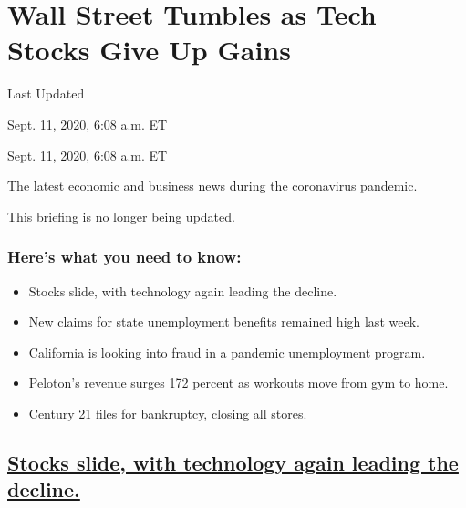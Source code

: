\hypertarget{wall-street-tumbles-as-tech-stocks-give-up-gains}{%
\section{Wall Street Tumbles as Tech Stocks Give Up
Gains}\label{wall-street-tumbles-as-tech-stocks-give-up-gains}}

Last Updated

Sept. 11, 2020, 6:08 a.m. ET

Sept. 11, 2020, 6:08 a.m. ET

The latest economic and business news during the coronavirus pandemic.

This briefing is no longer being updated.

\hypertarget{heres-what-you-need-to-know}{%
\subsubsection{Here's what you need to
know:}\label{heres-what-you-need-to-know}}

\begin{itemize}
\item
  \protect\hyperlink{stocks-slide-with-technology-again-leading-the-decline}{}

  Stocks slide, with technology again leading the decline.
\item
  \protect\hyperlink{new-claims-for-state-unemployment-benefits-remained-high-last-week}{}

  New claims for state unemployment benefits remained high last week.
\item
  \protect\hyperlink{california-is-looking-into-fraud-in-a-pandemic-unemployment-program}{}

  California is looking into fraud in a pandemic unemployment program.
\item
  \protect\hyperlink{pelotons-revenue-surges-172-percent-as-workouts-move-from-gym-to-home}{}

  Peloton's revenue surges 172 percent as workouts move from gym to
  home.
\item
  \protect\hyperlink{century-21-files-for-bankruptcy-closing-all-stores}{}

  Century 21 files for bankruptcy, closing all stores.
\end{itemize}

\hypertarget{stocks-slide-with-technology-again-leading-the-decline}{%
\subsection{\texorpdfstring{\protect\hyperlink{stocks-slide-with-technology-again-leading-the-decline}{Stocks
slide, with technology again leading the
decline.}}{Stocks slide, with technology again leading the decline.}}\label{stocks-slide-with-technology-again-leading-the-decline}}

